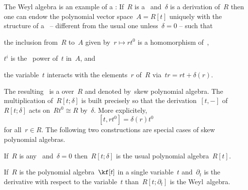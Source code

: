 \begin{remark}
  The Weyl algebra is an example of a :
  If~$R$ is a~{\algebra{$\kf$}} and~$\delta$ is a derivation of~$R$ then one can endow the polynomial vector space~$A = R[t]$ uniquely with the structure of a~{\algebra{$\kf$}} -- different from the usual one unless~$\delta = 0$ -- such that
  \begin{itemize*}
    \item
      the inclusion from~$R$ to~$A$ given by~$r \mapsto r t^0$ is a homomorphism of~\algebras{$\kf$},
    \item
      $t^i$ is the~{} power of~$t$ in~$A$, and
    \item
      the variable~$t$ interacts with the elements~$r$ of~$R$ via~$tr = rt + \delta(r)$.
  \end{itemize*}
  The resulting~{\algebra{$\kf$}} is a  over~$R$ and denoted by~\gls*{skew polynomial algebra}.
  The multiplication of~$R[t;\delta]$ is built precisely so that the derivation~$[t,-]$ of~$R[t;\delta]$ acts on~$R t^0 \cong R$ by~$\delta$.
  More explicitely,
  \[
    [t, r t^0]
    =
    \delta(r) t^0
  \]
  for all~$r \in R$.
  The following two constructions are special cases of skew polynomial algebras.
  \begin{enumerate*}
    \item
      If~$R$ is any~\algebra{$\kf$} and~$\delta = 0$ then~$R[t; \delta]$ is the usual polynomial algebra~$R[t]$.
    \item
      If~$R$ is the polynomial algebra~$\kf[t]$ in a single variable~$t$ and~$\partial_t$ is the derivative with respect to the variable~$t$ than~$R[t;\partial_t]$ is the Weyl~algebra.
  \end{enumerate*}

%
\end{remark}


